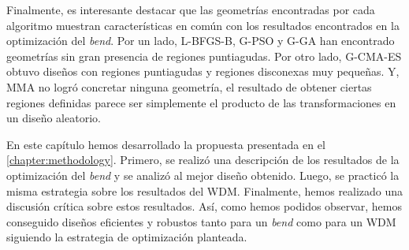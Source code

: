 Finalmente, es interesante destacar que las geometrías encontradas por cada algoritmo muestran
características en común con los resultados encontrados en la optimización del \emph{bend}.
Por un lado, L-BFGS-B, G-PSO y G-GA han encontrado geometrías sin gran presencia de regiones puntiagudas.
Por otro lado, G-CMA-ES obtuvo diseños con regiones puntiagudas y regiones disconexas muy pequeñas.
Y, MMA no logró concretar ninguna geometría, el resultado de obtener ciertas regiones definidas parece
ser simplemente el producto de las transformaciones en un diseño aleatorio.


En este capítulo hemos desarrollado la propuesta presentada en el \autoref{chapter:methodology}.
Primero, se realizó una descripción de los resultados de la optimización del \emph{bend} y 
se analizó al mejor diseño obtenido. 
Luego, se practicó la misma estrategia sobre los resultados del WDM.
Finalmente, hemos realizado una discusión crítica sobre estos resultados.
Así, como hemos podidos observar, hemos conseguido diseños eficientes y robustos tanto para un \emph{bend}
como para un WDM siguiendo la estrategia de optimización planteada.
